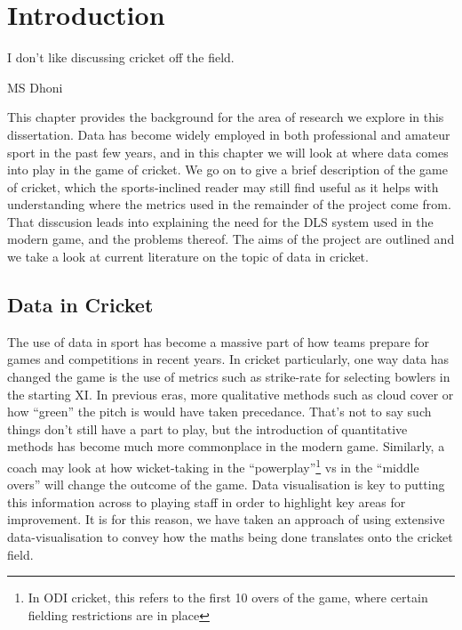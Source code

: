 \chapter{Introduction}

\epigraph{I don't like discussing cricket off the field.}{MS Dhoni}

This chapter provides the background for the area of research we explore in this dissertation. Data has become widely employed in both professional and amateur sport in the past few years, and 
in this chapter we will look at where data comes into play in the game of cricket. We go on to give a brief description of the game of cricket, which the sports-inclined reader may 
still find useful as it helps with understanding where the metrics used in the remainder of the project come from. That disscusion leads into explaining the need for 
the DLS system used in the modern game, and the problems thereof. The aims of the project are outlined and we take a look at current literature on the topic of data in cricket. 

\section{Data in Cricket}
The use of data in sport has become a massive part of how teams prepare for games and competitions in recent years. In cricket particularly, one way data has changed the game is the use
of metrics such as strike-rate for selecting bowlers in the starting XI. In previous eras, more qualitative methods such as cloud cover or how ``green'' the pitch is would have taken precedance.
That's not to say such things don't still have a part to play, but the introduction of quantitative methods has become much more commonplace in the modern game.
Similarly, a coach may look at how wicket-taking in the ``powerplay''\footnote{In ODI cricket, this refers to the first 10 overs of the game, where certain fielding restrictions are in place}
vs in the ``middle overs'' will change the outcome of the game. Data visualisation is key to putting this information across to playing staff in order to highlight key areas for
improvement. It is for this reason, we have taken an approach of using extensive data-visualisation to convey how the maths being done translates onto the cricket field. \\ 

